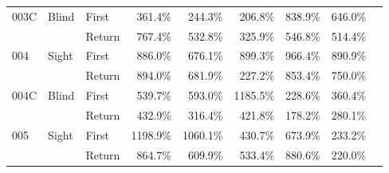 \begin{table}[!htb]
\begin{tabular}{lllrrrrrr}
003C & Blind & First &   361.4\% &   244.3\% &                                               206.8\% &                                                838.9\% &   646.0\% \\
    &       & Return &   767.4\% &   532.8\% &                                               325.9\% &                                                546.8\% &   514.4\% \\
004 & Sight & First &   886.0\% &   676.1\% &                                               899.3\% &                                                966.4\% &   890.9\% \\
    &       & Return &   894.0\% &   681.9\% &                                               227.2\% &                                                853.4\% &   750.0\% \\
004C & Blind & First &   539.7\% &   593.0\% &                                              1185.5\% &                                                228.6\% &   360.4\% \\
    &       & Return &   432.9\% &   316.4\% &                                               421.8\% &                                                178.2\% &   280.1\% \\
005 & Sight & First &  1198.9\% &  1060.1\% &                                               430.7\% &                                                673.9\% &   233.2\% \\
    &       & Return &   864.7\% &   609.9\% &                                               533.4\% &                                                880.6\% &   220.0\% \\
\bottomrule
\end{tabular}
\end{table}


